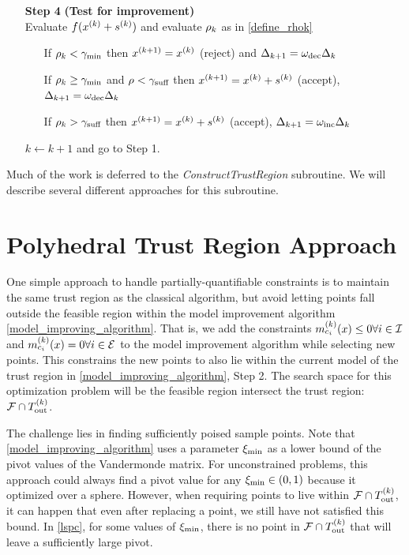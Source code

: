 \begin{algorithm}[H]
\begin{itemize}
        \item[\textbf{Step 4}] \textbf{(Test for improvement)} \\
            Evaluate $f(x^{(k)} + {{s}^{(k)}})$ and evaluate $\rho_k$ as in \cref{define_rhok} \begin{itemize}
                \item[] If $\rho_k < \gamma_{\textrm{min}}$ then ${{x}^{(k+1)}}=x^{(k)}$ (reject) and $\Delta_{k+1} = \omega_{\text{dec}}\Delta_k$
                \item[] If $\rho_k \ge \gamma_{\textrm{min}}$ and $\rho < \gamma_{\textrm{suff}}$ then ${{x}^{(k+1)}}=x^{(k)}+{{s}^{(k)}}$ (accept), $\Delta_{k+1} = \omega_{\text{dec}}\Delta_k$
                \item[] If $\rho_k > \gamma_{\textrm{suff}}$ then ${{x}^{(k+1)}}=x^{(k)}+{{s}^{(k)}}$ (accept), $\Delta_{k+1} = \omega_{\text{inc}}\Delta_k$
            \end{itemize}
            $k \gets k+1$ and go to Step 1.
    \end{itemize}
\end{algorithm}
 

Much of the work is deferred to the \emph{ConstructTrustRegion} subroutine.
We will describe several different approaches for this subroutine.

\section{Polyhedral Trust Region Approach}
One simple approach to handle partially-quantifiable constraints is to maintain the same trust region as the classical algorithm, but avoid letting points fall outside the feasible region within the model improvement algorithm \cref{model_improving_algorithm}.
That is, we add the constraints ${{m}^{(k)}_{c_i}}(x) \le 0 \forall i \in \mathcal{I}$ and ${{m}^{(k)}_{c_i}}(x) = 0 \forall i \in \mathcal{E}$ to the model improvement algorithm while selecting new points.
This constrains the new points to also lie within the current model of the trust region in \cref{model_improving_algorithm}, Step 2.
The search space for this optimization problem will be the feasible region intersect the trust region: ${\mathcal F} \cap {T_{\text{out}}^{(k)}} $.

The challenge lies in finding sufficiently poised sample points.
Note that \cref{model_improving_algorithm} uses a parameter $  \xi_{\text{min}} $ as a lower bound of the pivot values of the Vandermonde matrix.
For unconstrained problems, this approach could always find a pivot value for any $ \xi_{\text{min}} \in (0,1)$ because it optimized over a sphere.
However, when requiring points to live within $ {\mathcal F} \cap {T_{\text{out}}^{(k)}} $, it can happen that even after replacing a point, we still have not satisfied this bound.
In \cref{lspc}, for some values of $  \xi_{\text{min}} $, there is no point in $ {\mathcal F} \cap {T_{\text{out}}^{(k)}} $ that will leave a sufficiently large pivot.

